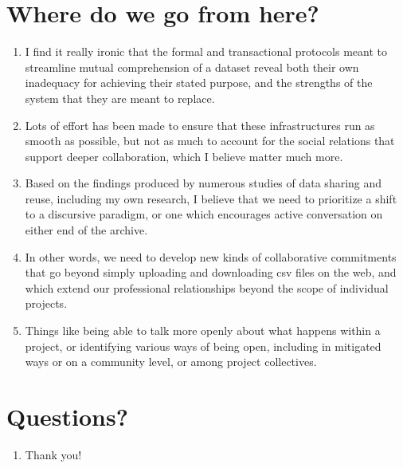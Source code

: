 \documentclass[12pt]{article}
\begin{document}
\section{Where do we go from here?}
\begin{enumerate}
  \item I find it really ironic that the formal and transactional protocols meant to streamline mutual comprehension of a dataset reveal both their own inadequacy for achieving their stated purpose, and the strengths of the system that they are meant to replace.
  \item Lots of effort has been made to ensure that these infrastructures run as smooth as possible, but not as much to account for the social relations that support deeper collaboration, which I believe matter much more.
  \item Based on the findings produced by numerous studies of data sharing and reuse, including my own research, I believe that we need to prioritize a shift to a discursive paradigm, or one which encourages active conversation on either end of the archive.
  \item In other words, we need to develop new kinds of collaborative commitments that go beyond simply uploading and downloading csv files on the web, and which extend our professional relationships beyond the scope of individual projects.
  \item Things like being able to talk more openly about what happens within a project, or identifying various ways of being open, including in mitigated ways or on a community level, or among project collectives.
\end{enumerate}

\section{Questions?}
\begin{enumerate}
  \item Thank you!
\end{enumerate}
\end{document}
